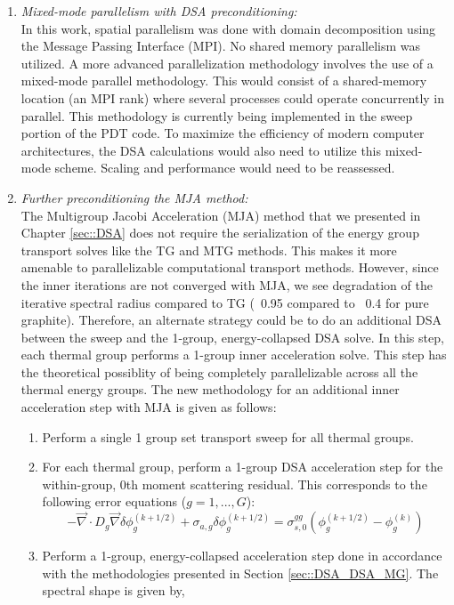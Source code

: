 \begin{enumerate}
\item {\em Mixed-mode parallelism with DSA preconditioning:} \\
In this work, spatial parallelism was done with domain decomposition using the Message Passing Interface (MPI). No shared memory parallelism was utilized. A more advanced parallelization methodology involves the use of a mixed-mode parallel methodology. This would consist of a shared-memory location (an MPI rank) where several processes could operate concurrently in parallel. This methodology is currently being implemented in the sweep portion of the PDT code. To maximize the efficiency of modern computer architectures, the DSA calculations would also need to utilize this mixed-mode scheme. Scaling and performance would need to be reassessed.
\item {\em Further preconditioning the MJA method:} \\
The Multigroup Jacobi Acceleration (MJA) method that we presented in Chapter \ref{sec::DSA} does not require the serialization of the energy group transport solves like the TG and MTG methods. This makes it more amenable to parallelizable computational transport methods. However, since the inner iterations are not converged with MJA, we see degradation of the iterative spectral radius compared to TG (~0.95 compared to ~0.4 for pure graphite). Therefore, an alternate strategy could be to do an additional DSA between the sweep and the 1-group, energy-collapsed DSA solve. In this step, each thermal group performs a 1-group inner acceleration solve. This step has the theoretical possiblity of being completely parallelizable across all the thermal energy groups. The new methodology for an additional inner acceleration step with MJA is given as follows:
	\begin{enumerate}
	\item Perform a single 1 group set transport sweep for all thermal groups.
	\item For each thermal group, perform a 1-group DSA acceleration step for the within-group, 0th moment scattering residual. This corresponds to the following error equations ($g=1,...,G$):
	        \begin{equation*}
	        -\vec{\nabla} \cdot D_g \vec{\nabla} \delta \phi_g^{(k+1/2)} + \sigma_{a,g} \delta \phi_g^{(k+1/2)} = \sigma_{s,0}^{gg} \left( \phi_g^{(k+1/2)} - \phi_g^{(k)}\right)
	        \end{equation*}
	\item Perform a 1-group, energy-collapsed acceleration step done in accordance with the methodologies presented in Section \ref{sec::DSA_DSA_MG}. The spectral shape is given by,

\end{enumerate}
\end{enumerate}
